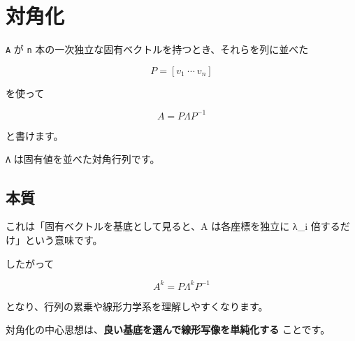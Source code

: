 \documentclass[
  11pt,
  a4paper,
]{ltjsarticle}
\author{}
\date{}
\begin{document}
\hypertarget{ux5bfeux89d2ux5316}{%
\section{対角化}\label{ux5bfeux89d2ux5316}}

\texttt{A} が \texttt{n}
本の一次独立な固有ベクトルを持つとき、それらを列に並べた

\[
P=[v_1\ \cdots\ v_n]
\]

を使って

\[
\boxed{A=P\Lambda P^{-1}}
\]

と書けます。

\texttt{Λ} は固有値を並べた対角行列です。

\hypertarget{ux672cux8cea}{%
\subsection{本質}\label{ux672cux8cea}}

これは「固有ベクトルを基底として見ると、A は各座標を独立に λ\_i
倍するだけ」という意味です。

したがって

\[
A^k=P\Lambda^kP^{-1}
\]

となり、行列の累乗や線形力学系を理解しやすくなります。

対角化の中心思想は、\textbf{良い基底を選んで線形写像を単純化する}
ことです。
\end{document}
